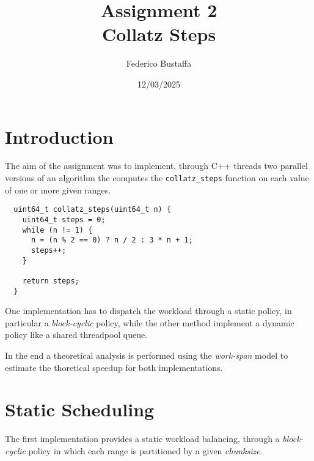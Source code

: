 \documentclass[12pt, a4paper]{article}
\title{Assignment 2\\Collatz Steps}
\author{Federico Bustaffa}
\date{12/03/2025}
\begin{document}
\maketitle
\tableofcontents
\clearpage

\section{Introduction}

The aim of the assignment was to implement, through C++ threads two parallel
versions of an algorithm the computes the \verb|collatz_steps| function on each
value of one or more given ranges.

\begin{verbatim}
  uint64_t collatz_steps(uint64_t n) {
    uint64_t steps = 0;
    while (n != 1) {
      n = (n % 2 == 0) ? n / 2 : 3 * n + 1;
      steps++;
    }

    return steps;
  }
\end{verbatim}

One implementation has to dispatch the workload through a static policy, in
particular a \emph{block-cyclic} policy, while the other method implement a
dynamic policy like a shared threadpool queue.

In the end a theoretical analysis is performed using the \emph{work-span} model
to estimate the thoretical speedup for both implementations.

\section{Static Scheduling}

The first implementation provides a static workload balancing, through a
\emph{block-cyclic} policy in which each range is partitioned by a given
\emph{chunksize}.
\end{document}
